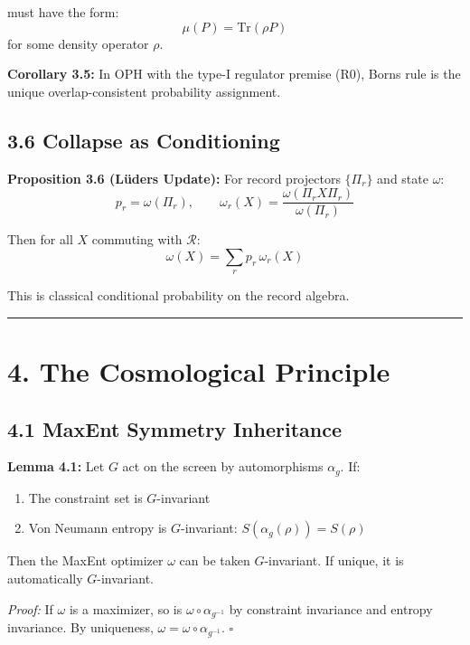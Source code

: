 must have the form: \[\mu(P) = \text{Tr}(\rho P)\] for some density operator \(\rho\).

\textbf{Corollary 3.5:} In OPH with the type-I regulator premise (R0), Born\textquotesingle s rule is the unique overlap-consistent probability assignment.

\subsection{3.6 Collapse as Conditioning}\label{36-collapse-as-conditioning}

\textbf{Proposition 3.6 (L\"{u}ders Update):} For record projectors \(\{\Pi_r\}\) and state \(\omega\): \[p_r = \omega(\Pi_r), \qquad \omega_r(X) = \frac{\omega(\Pi_r X \Pi_r)}{\omega(\Pi_r)}\]

Then for all \(X\) commuting with \(\mathcal{R}\): \[\omega(X) = \sum_r p_r \, \omega_r(X)\]

This is classical conditional probability on the record algebra.

\begin{center}\rule{0.5\linewidth}{0.5pt}\end{center}

\section{4. The Cosmological Principle}\label{4-the-cosmological-principle}

\subsection{4.1 MaxEnt Symmetry Inheritance}\label{41-maxent-symmetry-inheritance}

\textbf{Lemma 4.1:} Let \(G\) act on the screen by automorphisms \(\alpha_g\). If:

\begin{enumerate}
\def\labelenumi{\arabic{enumi}.}
\tightlist
\item
  The constraint set is \(G\)-invariant
\item
  Von Neumann entropy is \(G\)-invariant: \(S(\alpha_g(\rho)) = S(\rho)\)
\end{enumerate}

Then the MaxEnt optimizer \(\omega\) can be taken \(G\)-invariant. If unique, it is automatically \(G\)-invariant.

\emph{Proof:} If \(\omega\) is a maximizer, so is \(\omega \circ \alpha_{g^{-1}}\) by constraint invariance and entropy invariance. By uniqueness, \(\omega = \omega \circ \alpha_{g^{-1}}\). \(\square\)

